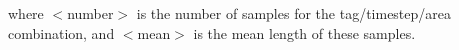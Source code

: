 \documentclass[10pt,twoside]{book}
\begin{document}
where $<$number$>$ is the number of samples for the tag/timestep/area combination, and $<$mean$>$ is the mean length of these samples.






\end{document}
